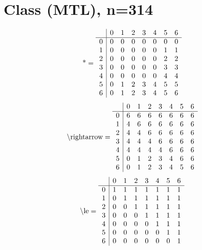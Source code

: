 \documentclass[11pt]{article}
\begin{document}
\section{Class (MTL), n=314}
\[\text{*} = 
\begin{array}{r | r r r r r r r}
 & 0 & 1 & 2 & 3 & 4 & 5 & 6 \\ \hline
0 & 0 & 0 & 0 & 0 & 0 & 0 & 0 \\
1 & 0 & 0 & 0 & 0 & 0 & 1 & 1 \\
2 & 0 & 0 & 0 & 0 & 0 & 2 & 2 \\
3 & 0 & 0 & 0 & 0 & 0 & 3 & 3 \\
4 & 0 & 0 & 0 & 0 & 0 & 4 & 4 \\
5 & 0 & 1 & 2 & 3 & 4 & 5 & 5 \\
6 & 0 & 1 & 2 & 3 & 4 & 5 & 6 \\
\end{array}
\]
\[\text{\textbackslash rightarrow} = 
\begin{array}{r | r r r r r r r}
 & 0 & 1 & 2 & 3 & 4 & 5 & 6 \\ \hline
0 & 6 & 6 & 6 & 6 & 6 & 6 & 6 \\
1 & 4 & 6 & 6 & 6 & 6 & 6 & 6 \\
2 & 4 & 4 & 6 & 6 & 6 & 6 & 6 \\
3 & 4 & 4 & 4 & 6 & 6 & 6 & 6 \\
4 & 4 & 4 & 4 & 4 & 6 & 6 & 6 \\
5 & 0 & 1 & 2 & 3 & 4 & 6 & 6 \\
6 & 0 & 1 & 2 & 3 & 4 & 5 & 6 \\
\end{array}
\]
\[\text{\textbackslash le} = 
\begin{array}{r | r r r r r r r}
 & 0 & 1 & 2 & 3 & 4 & 5 & 6 \\ \hline
0 & 1 & 1 & 1 & 1 & 1 & 1 & 1 \\
1 & 0 & 1 & 1 & 1 & 1 & 1 & 1 \\
2 & 0 & 0 & 1 & 1 & 1 & 1 & 1 \\
3 & 0 & 0 & 0 & 1 & 1 & 1 & 1 \\
4 & 0 & 0 & 0 & 0 & 1 & 1 & 1 \\
5 & 0 & 0 & 0 & 0 & 0 & 1 & 1 \\
6 & 0 & 0 & 0 & 0 & 0 & 0 & 1 \\
\end{array}
\]
\end{document}
